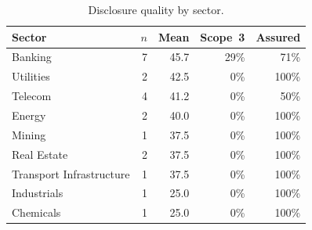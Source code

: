 \begin{table}[t]\centering
\caption{Disclosure quality by sector.}\label{tab:sector}
\begin{tabular}{lrrrr}\toprule
Sector & $n$ & Mean \dqs{} & Scope~3 & Assured \\ \midrule
Banking & 7 & 45.7 & 29\% & 71\% \\
Utilities & 2 & 42.5 & 0\% & 100\% \\
Telecom & 4 & 41.2 & 0\% & 50\% \\
Energy & 2 & 40.0 & 0\% & 100\% \\
Mining & 1 & 37.5 & 0\% & 100\% \\
Real Estate & 2 & 37.5 & 0\% & 100\% \\
Transport Infrastructure & 1 & 37.5 & 0\% & 100\% \\
Industrials & 1 & 25.0 & 0\% & 100\% \\
Chemicals & 1 & 25.0 & 0\% & 100\% \\
\bottomrule\end{tabular}\end{table}

